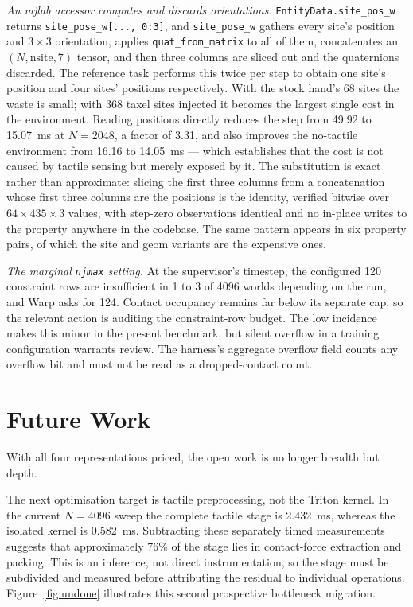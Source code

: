\documentclass[journal]{IEEEtran}
\begin{document}
\textit{An mjlab accessor computes and discards orientations.} \texttt{EntityData.site\_pos\_w} returns \texttt{site\_pose\_w[..., 0:3]}, and \texttt{site\_pose\_w} gathers every site's position and $3\times3$ orientation, applies \texttt{quat\_from\_matrix} to all of them, concatenates an $(N, \mathrm{nsite}, 7)$ tensor, and then three columns are sliced out and the quaternions discarded. The reference task performs this twice per step to obtain one site's position and four sites' positions respectively. With the stock hand's 68 sites the waste is small; with 368 taxel sites injected it becomes the largest single cost in the environment. Reading positions directly reduces the step from 49.92 to 15.07~ms at $N=2048$, a factor of 3.31, and also improves the no-tactile environment from 16.16 to 14.05~ms --- which establishes that the cost is not caused by tactile sensing but merely exposed by it. The substitution is exact rather than approximate: slicing the first three columns from a concatenation whose first three columns are the positions is the identity, verified bitwise over $64\times435\times3$ values, with step-zero observations identical and no in-place writes to the property anywhere in the codebase. The same pattern appears in six property pairs, of which the site and geom variants are the expensive ones.

\textit{The marginal \texttt{njmax} setting.} At the supervisor's timestep, the configured 120 constraint rows are insufficient in 1 to 3 of 4096 worlds depending on the run, and Warp asks for 124. Contact occupancy remains far below its separate cap, so the relevant action is auditing the constraint-row budget. The low incidence makes this minor in the present benchmark, but silent overflow in a training configuration warrants review. The harness's aggregate overflow field counts any overflow bit and must not be read as a dropped-contact count.

\section{Future Work}

With all four representations priced, the open work is no longer breadth but depth.

The next optimisation target is tactile preprocessing, not the Triton kernel. In the current $N=4096$ sweep the complete tactile stage is 2.432~ms, whereas the isolated kernel is 0.582~ms. Subtracting these separately timed measurements suggests that approximately 76\% of the stage lies in contact-force extraction and packing. This is an inference, not direct instrumentation, so the stage must be subdivided and measured before attributing the residual to individual operations. Figure~\ref{fig:undone} illustrates this second prospective bottleneck migration.
\end{document}
